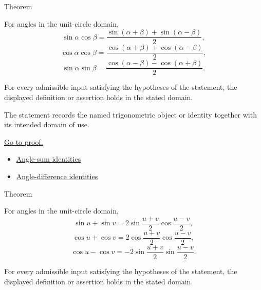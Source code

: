 

\begin{theorembox}{Theorem}
\begin{theorem}
\label{thm:trig-product-to-sum-identities}
For angles in the unit-circle domain,
\[
\sin\alpha\cos\beta
=\frac{\sin(\alpha+\beta)+\sin(\alpha-\beta)}{2},
\]
\[
\cos\alpha\cos\beta
=\frac{\cos(\alpha+\beta)+\cos(\alpha-\beta)}{2},
\]
\[
\sin\alpha\sin\beta
=\frac{\cos(\alpha-\beta)-\cos(\alpha+\beta)}{2}.
\]
\end{theorem}
\end{theorembox}
\begin{remark*}
For every admissible input satisfying the hypotheses of the statement, the
displayed definition or assertion holds in the stated domain.
\end{remark*}

\begin{remark*}[Interpretation]
The statement records the named trigonometric object or identity together with
its intended domain of use.
\end{remark*}

\begin{remark*}[Proof]
\hyperref[prf:trig-product-to-sum-identities]{Go to proof.}
\end{remark*}
\begin{dependencies}
\begin{itemize}
  \item \hyperref[thm:trig-angle-sum-identities]{Angle-sum identities}
  \item \hyperref[thm:trig-angle-difference-identities]{Angle-difference identities}
\end{itemize}
\end{dependencies}



\begin{theorembox}{Theorem}
\begin{theorem}
\label{thm:trig-sum-to-product-identities}
For angles in the unit-circle domain,
\[
\sin u+\sin v
=2\sin\frac{u+v}{2}\cos\frac{u-v}{2},
\]
\[
\cos u+\cos v
=2\cos\frac{u+v}{2}\cos\frac{u-v}{2},
\]
\[
\cos u-\cos v
=-2\sin\frac{u+v}{2}\sin\frac{u-v}{2}.
\]
\end{theorem}
\end{theorembox}
\begin{remark*}
For every admissible input satisfying the hypotheses of the statement, the
displayed definition or assertion holds in the stated domain.
\end{remark*}

